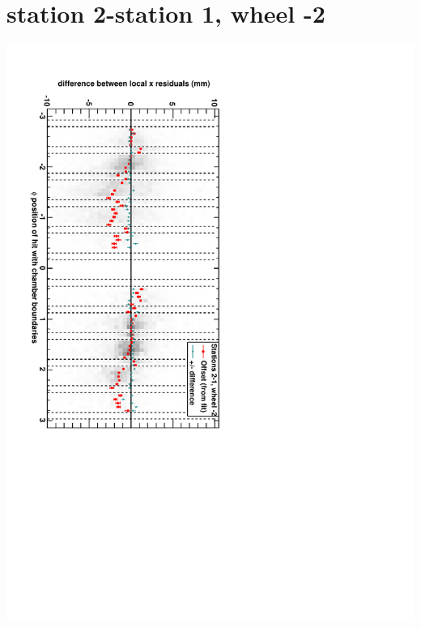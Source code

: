 \documentclass[compress]{beamer}
\begin{document}
\section*{station 2-station 1, wheel -2}
\begin{frame} \vfill \mbox{\hspace{-1 cm}\includegraphics[height=1.2\linewidth, angle=90]{DTrphidiff12VsPhi_whA_slope.pdf}} \end{frame}
\end{document}

